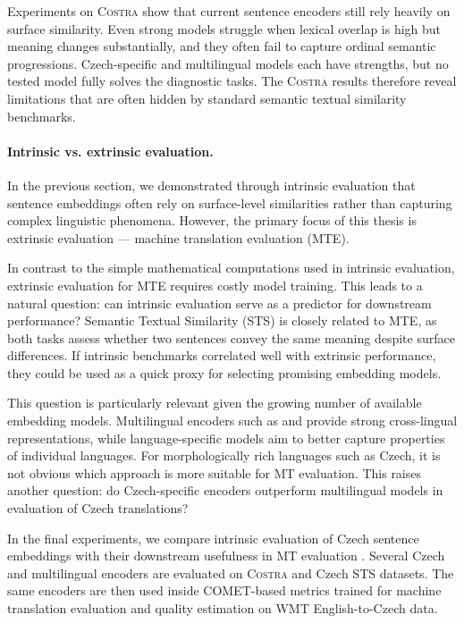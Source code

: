 \documentclass[12pt,a4paper]{report}
\newcommand{\comet}{\textsc{COMET}\xspace}
\newcommand{\costra}{\textsc{Costra}\xspace}
\begin{document}
Experiments on \costra show that current sentence encoders still rely heavily on surface 
similarity. Even strong models struggle when lexical overlap is high but meaning changes 
substantially, and they often fail to capture ordinal semantic progressions. Czech-specific 
and multilingual models each have strengths, but no tested model fully solves the diagnostic 
tasks. The \costra results therefore reveal limitations that are often hidden by standard 
semantic textual similarity benchmarks.

\paragraph{Intrinsic vs. extrinsic evaluation.}

In the previous section, we demonstrated through intrinsic evaluation that sentence 
embeddings often rely on surface-level similarities rather than capturing complex 
linguistic phenomena. However, the primary focus of this thesis is extrinsic 
evaluation --- machine translation evaluation (MTE). 

In contrast to the simple mathematical computations used in intrinsic evaluation, 
extrinsic evaluation for MTE requires costly model training. This leads to a natural 
question: can intrinsic evaluation serve as a predictor for downstream performance? 
Semantic Textual Similarity (STS) is closely related to MTE, as both tasks assess 
whether two sentences convey the same meaning despite surface differences. If intrinsic 
benchmarks correlated well with extrinsic performance, they could be used as a quick 
proxy for selecting promising embedding models. 

This question is particularly relevant given the growing number of available embedding 
models. Multilingual encoders such as \labse and \xlmr provide strong cross-lingual 
representations, while language-specific models aim to better capture properties of 
individual languages. For morphologically rich languages such as Czech, it is not 
obvious which approach is more suitable for MT evaluation. This raises another question: 
do Czech-specific encoders outperform multilingual models in evaluation of Czech translations?

In the final experiments, we compare intrinsic evaluation of Czech sentence embeddings 
with their downstream usefulness in MT evaluation \citep{barancikova-bojar-2025-intrinsic}. 
Several Czech and multilingual encoders are evaluated on \costra and Czech STS datasets. 
The same encoders are then used inside \comet-based metrics trained for machine translation 
evaluation and quality estimation on WMT English-to-Czech data.
\end{document}
